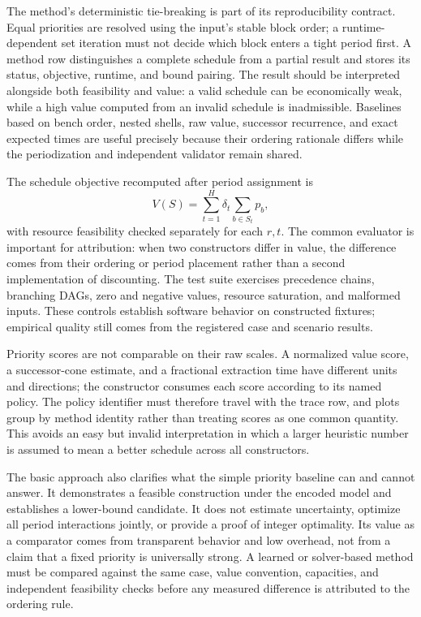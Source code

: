 The method's deterministic tie-breaking is part of its reproducibility contract. Equal priorities are resolved using the input's stable block order; a runtime-dependent set iteration must not decide which block enters a tight period first. A method row distinguishes a complete schedule from a partial result and stores its status, objective, runtime, and bound pairing. The result should be interpreted alongside both feasibility and value: a valid schedule can be economically weak, while a high value computed from an invalid schedule is inadmissible. Baselines based on bench order, nested shells, raw value, successor recurrence, and exact expected times are useful precisely because their ordering rationale differs while the periodization and independent validator remain shared.

The schedule objective recomputed after period assignment is
\begin{equation}
 V(S)=\sum_{t=1}^{H}\delta_t\sum_{b\in S_t}p_b,
\end{equation}
with resource feasibility checked separately for each $r,t$. The common evaluator is important for attribution: when two constructors differ in value, the difference comes from their ordering or period placement rather than a second implementation of discounting. The test suite exercises precedence chains, branching DAGs, zero and negative values, resource saturation, and malformed inputs. These controls establish software behavior on constructed fixtures; empirical quality still comes from the registered case and scenario results.

Priority scores are not comparable on their raw scales. A normalized value score, a successor-cone estimate, and a fractional extraction time have different units and directions; the constructor consumes each score according to its named policy. The policy identifier must therefore travel with the trace row, and plots group by method identity rather than treating scores as one common quantity. This avoids an easy but invalid interpretation in which a larger heuristic number is assumed to mean a better schedule across all constructors.

The basic approach also clarifies what the simple priority baseline can and cannot answer. It demonstrates a feasible construction under the encoded model and establishes a lower-bound candidate. It does not estimate uncertainty, optimize all period interactions jointly, or provide a proof of integer optimality. Its value as a comparator comes from transparent behavior and low overhead, not from a claim that a fixed priority is universally strong. A learned or solver-based method must be compared against the same case, value convention, capacities, and independent feasibility checks before any measured difference is attributed to the ordering rule.

